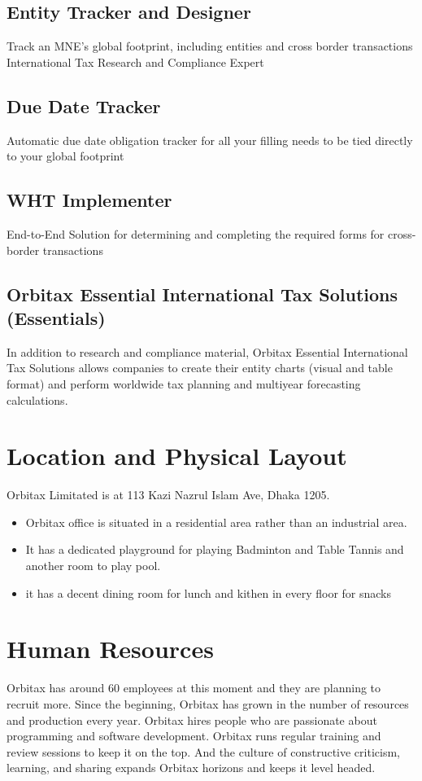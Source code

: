 \begin{flushleft}
\subsection{Entity Tracker and Designer}
Track an MNE’s global footprint, including entities and cross border transactions
International Tax Research and Compliance Expert

\subsection{Due Date Tracker}
Automatic due date obligation tracker for all your filling needs to be tied directly to your global footprint


\subsection{WHT Implementer}
End-to-End Solution for determining and completing the required forms for cross-border transactions

\subsection{Orbitax Essential International Tax Solutions (Essentials)}
In addition to research and compliance material, Orbitax Essential International Tax Solutions allows companies to create their entity charts (visual and table format) and perform worldwide tax planning and multiyear forecasting calculations.


\section{Location and Physical Layout}
Orbitax Limitated is at 113 Kazi Nazrul Islam Ave, Dhaka 1205.

\begin{itemize}
  \item Orbitax office is situated in a residential area rather than an industrial area.

  \item It has a dedicated playground for playing Badminton and Table Tannis and another room to play pool.
  
  \item it has a decent dining room for lunch and kithen in every floor for snacks
\end{itemize}


\section{Human Resources}
Orbitax has around 60 employees at this moment and they are planning to recruit more. Since the beginning, Orbitax has grown in the number of resources and production every year.
Orbitax hires people who are passionate about programming and software development. Orbitax runs regular training and review sessions to keep it on the top. And the culture of constructive criticism, learning, and sharing expands Orbitax horizons and keeps it level headed.



\end{flushleft}
